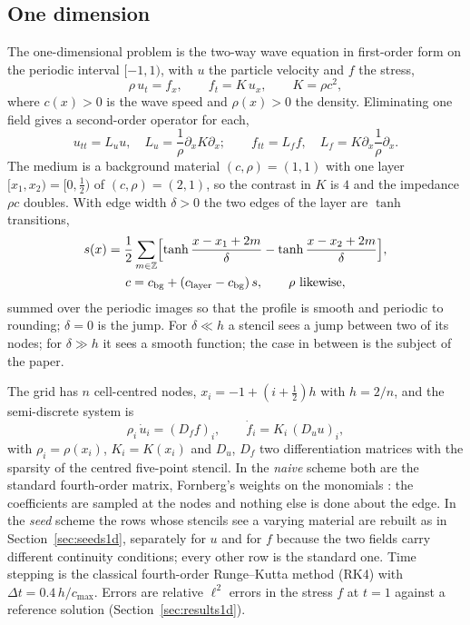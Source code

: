 \documentclass[11pt]{amsart}
\theoremstyle{definition}
\theoremstyle{remark}
\newcommand{\Lu}{L_u}
\newcommand{\Lf}{L_f}
\newcommand{\px}{\partial_x}
\begin{document}
\subsection{One dimension}
\label{sec:setting1d}
The one-dimensional problem is the two-way wave equation in first-order
form on the periodic interval $[-1, 1)$, with $u$ the particle velocity
and $f$ the stress,
\begin{equation}
  \label{eq:sys1d}
  \rho\, u_t = f_x, \qquad f_t = K\, u_x, \qquad K = \rho c^2,
\end{equation}
where $c(x) > 0$ is the wave speed and $\rho(x) > 0$ the density. Eliminating one
field gives a second-order operator for each,
\begin{equation}
  \label{eq:Lops}
  u_{tt} = \Lu u, \quad \Lu = \frac{1}{\rho} \px K \px; \qquad
  f_{tt} = \Lf f, \quad \Lf = K \px \frac{1}{\rho} \px .
\end{equation}
The medium is a background material $(c, \rho) = (1, 1)$ with one layer
$[x_1, x_2) = [0, \tfrac12)$ of $(c, \rho) = (2, 1)$, so the contrast in
$K$ is $4$ and the impedance $\rho c$ doubles. With edge width
$\delta > 0$ the two edges of the layer are $\tanh$ transitions,
\begin{equation}
  \label{eq:profile1d}
  \begin{gathered}
  s(x) = \frac12 \sum_{m \in \mathbb{Z}} \Bigl[
    \tanh\frac{x - x_1 + 2m}{\delta} - \tanh\frac{x - x_2 + 2m}{\delta}
  \Bigr], \\
  c = c_{\mathrm{bg}} + (c_{\mathrm{layer}} - c_{\mathrm{bg}})\, s,
  \qquad \rho \text{ likewise},
  \end{gathered}
\end{equation}
summed over the periodic images so that the profile is smooth and
periodic to rounding; $\delta = 0$ is the jump. For
$\delta \ll h$ a stencil sees a jump between two of its nodes; for
$\delta \gg h$ it sees a smooth function; the case in between is the
subject of the paper.

The grid has $n$ cell-centred nodes, $x_i = -1 + (i + \tfrac12) h$ with
$h = 2 / n$, and the semi-discrete system is
\begin{equation}
  \label{eq:semi1d}
  \rho_i\, \dot u_i = (D_f f)_i, \qquad \dot f_i = K_i\, (D_u u)_i,
\end{equation}
with $\rho_i = \rho(x_i)$, $K_i = K(x_i)$ and $D_u$, $D_f$ two
differentiation matrices with the sparsity of the centred five-point
stencil. In the \emph{naive} scheme both are the standard fourth-order
matrix, Fornberg's weights on the monomials \cite{Fornberg1988}: the
coefficients are sampled at the nodes and nothing else is done about the
edge. In the \emph{seed} scheme the rows whose stencils see a varying
material are rebuilt as in Section~\ref{sec:seeds1d}, separately for
$u$ and for $f$ because the two fields carry different continuity
conditions; every other row is the standard one. Time stepping is the
classical fourth-order Runge--Kutta method (RK4) with
$\Delta t = 0.4\, h / c_{\max}$. Errors are relative $\ell^2$ errors in
the stress $f$ at $t = 1$ against a reference solution
(Section~\ref{sec:results1d}).
\end{document}
